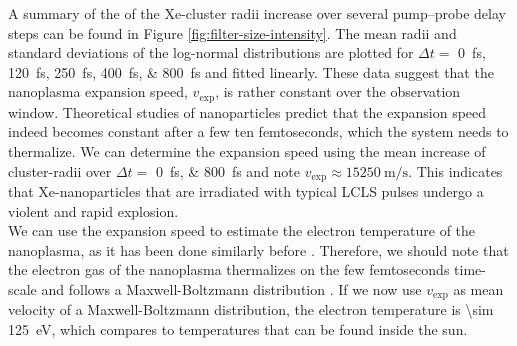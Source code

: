 A summary of the of the Xe-cluster radii increase over several pump--probe delay steps can be found in Figure \ref{fig:filter-size-intensity}. The mean radii and standard deviations of the log-normal distributions are plotted for $\Delta t=$ \SIlist{0;120;250;400;800}{\femto\second} and fitted linearly. These data suggest that the nanoplasma expansion speed, $v_{\text{exp}}$, is rather constant over the observation window. Theoretical studies of nanoparticles \cite{Hau-Riege-2004-PRE,Mikaberidze-2008-PRA,Ho-2016-PRA} predict that the expansion speed indeed becomes constant after a few ten femtoseconds, which the system needs to thermalize. We can determine the expansion speed using the mean increase of cluster-radii over $\Delta t=$ \SIlist{0;800}{\femto\second} and note $v_{\text{exp}}\approx \SI{15250}{\meter\per\second}$. This indicates that Xe-nanoparticles that are irradiated with typical LCLS pulses undergo a violent and rapid explosion.\\[1\baselineskip]
%
We can use the expansion speed to estimate the electron temperature of the nanoplasma, as it has been done similarly before \cite{Gorkhover-2012-PRL}. Therefore, we should note that the electron gas of the nanoplasma thermalizes on the few femtoseconds time-scale and follows a Maxwell-Boltzmann distribution \cite{Arbeiter-2011-NJP}. If we now use $v_{\text{exp}}$ as mean velocity of a Maxwell-Boltzmann distribution, the electron temperature is \SI{\sim 125}{\electronvolt}, which compares to temperatures that can be found inside the sun.\\[1\baselineskip]
%

